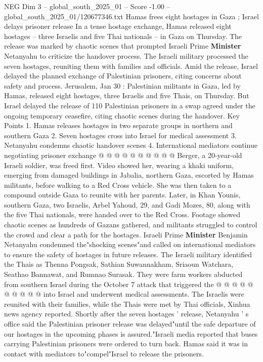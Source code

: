 \begin{textsample}{NEG Dim 3 – global\_south\_2025\_01 – Score -1.00 – global\_south\_2025\_01/120677346.txt}  \label{ex:f3_neg_059}
Hamas frees eight hostages in Gaza ; Israel delays prisoner release In a tense hostage exchange, Hamas released eight hostages -- three Israelis and five Thai nationals -- in Gaza on Thursday.
The release was marked by chaotic scenes that prompted Israeli Prime \textbf{Minister} Netanyahu to criticize the handover process.
The Israeli military processed the seven hostages, reuniting them with families and officials.
Amid the release, Israel delayed the planned exchange of Palestinian prisoners, citing concerns about safety and process.
Jerusalem, Jan 30 : Palestinian militants in Gaza, led by Hamas, released eight hostages, three Israelis and five Thais, on Thursday.
But Israel delayed the release of 110 Palestinian prisoners in a swap agreed under the ongoing temporary ceasefire, citing chaotic scenes during the handover.
Key Points 1.
Hamas releases hostages in two separate groups in northern and southern Gaza 2.
Seven hostages cross into Israel for medical assessment 3.
Netanyahu condemns chaotic handover scenes 4.
International mediators continue negotiating prisoner exchange @ @ @ @ @ @ @ @ @ @ Berger, a 20-year-old Israeli soldier, was freed first.
Video showed her, wearing a khaki uniform, emerging from damaged buildings in Jabalia, northern Gaza, escorted by Hamas militants, before walking to a Red Cross vehicle.
She was then taken to a compound outside Gaza to reunite with her parents.
Later, in Khan Younis, southern Gaza, two Israelis, Arbel Yahoud, 29, and Gadi Mozes, 80, along with the five Thai nationals, were handed over to the Red Cross.
Footage showed chaotic scenes as hundreds of Gazans gathered, and militants struggled to control the crowd and clear a path for the hostages.
Israeli Prime \textbf{Minister} Benjamin Netanyahu condemned the"shocking scenes"and called on international mediators to ensure the safety of hostages in future releases.
The Israeli military identified the Thais as Thenna Pongsak, Sathian Suwannakham, Sriaoun Watchara, Seathao Bannawat, and Rumnao Surasak.
They were farm workers abducted from southern Israel during the October 7 attack that triggered the @ @ @ @ @ @ @ @ @ @ into Israel and underwent medical assessments.
The Israelis were reunited with their families, while the Thais were met by Thai officials, Xinhua news agency reported.
Shortly after the seven hostages ' release, Netanyahu ' s office said the Palestinian prisoner release was delayed"until the safe departure of our hostages in the upcoming phases is assured."Israeli media reported that buses carrying Palestinian prisoners were ordered to turn back.
Hamas said it was in contact with mediators to"compel"Israel to release the prisoners.

\end{textsample}
